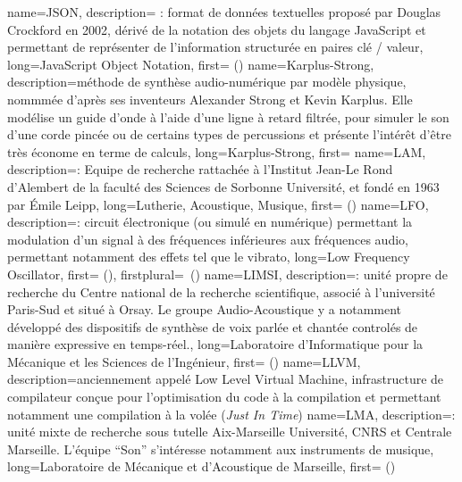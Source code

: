 {
    name={JSON},
    description={\textit{} : format de données textuelles proposé par Douglas Crockford en 2002, dérivé de la notation des objets du langage JavaScript et permettant de représenter de l’information structurée en paires clé / valeur},
    long={JavaScript Object Notation},
    first={ ()}
}
{
    name={Karplus-Strong},
    description={méthode de synthèse audio-numérique par modèle physique, nommmée d'après ses inventeurs Alexander Strong et Kevin Karplus. Elle modélise un guide d'onde à l'aide d'une ligne à retard filtrée, pour simuler le son d'une corde pincée ou de certains types de percussions et présente l'intérêt d'être très économe en terme de calculs},
    long={Karplus-Strong},
    first={}
}
{
    name={LAM},
    description={\textit{}: Equipe de recherche rattachée à l'Institut Jean-Le Rond d'Alembert de la faculté des Sciences de Sorbonne Université, et fondé en 1963 par Émile Leipp},
    long={Lutherie, Acoustique, Musique},
    first={ ()}
}
{
    name={LFO},
    description={\textit{}: circuit électronique (ou simulé en numérique) permettant la modulation d'un signal à des fréquences inférieures aux fréquences audio, permettant notamment des effets tel que le vibrato},
    long={Low Frequency Oscillator},
    first={ ()},
    firstplural={\glspluralsuffix\ (\glspluralsuffix)}
}
{
    name={LIMSI},
    description={\textit{}: unité propre de recherche du Centre national de la recherche scientifique, associé à l'université Paris-Sud et situé à Orsay. Le groupe Audio-Acoustique y a notamment développé des dispositifs de synthèse de voix parlée et chantée controlés de manière expressive en temps-réel.},
    long={Laboratoire d'Informatique pour la Mécanique et les Sciences de l'Ingénieur},
    first={ ()}
}
{
    name={LLVM},
    description={anciennement appelé Low Level Virtual Machine, infrastructure de compilateur conçue pour l'optimisation du code à la compilation et permettant notamment une compilation à la volée (\textit{Just In Time})}
}
{
    name={LMA},
    description={\textit{}: unité mixte de recherche sous tutelle Aix-Marseille Université, CNRS et Centrale Marseille. L'équipe ``Son'' s'intéresse notamment aux instruments de musique},
    long={Laboratoire de Mécanique et d'Acoustique de Marseille},
    first={ ()}
}
